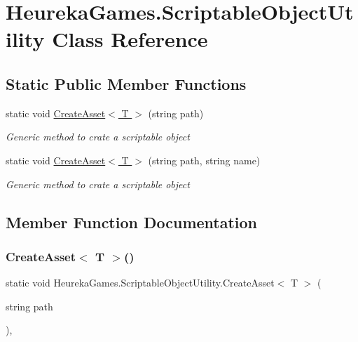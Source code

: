 \hypertarget{class_heureka_games_1_1_scriptable_object_utility}{}\section{Heureka\+Games.\+Scriptable\+Object\+Utility Class Reference}
\label{class_heureka_games_1_1_scriptable_object_utility}
\subsection*{Static Public Member Functions}
\begin{DoxyCompactItemize}
\item 
static void \hyperlink{class_heureka_games_1_1_scriptable_object_utility_aa9588599fc96da704a1dd8d45633fb98}{Create\+Asset$<$ T $>$} (string path)
\begin{DoxyCompactList}\small\item\em Generic method to crate a scriptable object \end{DoxyCompactList}\item 
static void \hyperlink{class_heureka_games_1_1_scriptable_object_utility_aab36c4d05b9cc324fde0ba92ef2b82d1}{Create\+Asset$<$ T $>$} (string path, string name)
\begin{DoxyCompactList}\small\item\em Generic method to crate a scriptable object \end{DoxyCompactList}\end{DoxyCompactItemize}


\subsection{Member Function Documentation}
\mbox{\label{class_heureka_games_1_1_scriptable_object_utility_aa9588599fc96da704a1dd8d45633fb98}} 
\subsubsection{\texorpdfstring{Create\+Asset$<$ T $>$()}{CreateAsset< T >()}\hspace{0.1cm}{\footnotesize\ttfamily [1/2]}}
{\footnotesize\ttfamily static void Heureka\+Games.\+Scriptable\+Object\+Utility.\+Create\+Asset$<$ T $>$ (\begin{DoxyParamCaption}\item[{string}]{path }\end{DoxyParamCaption})\hspace{0.3cm}{\ttfamily [inline]}, {\ttfamily [static]}}



